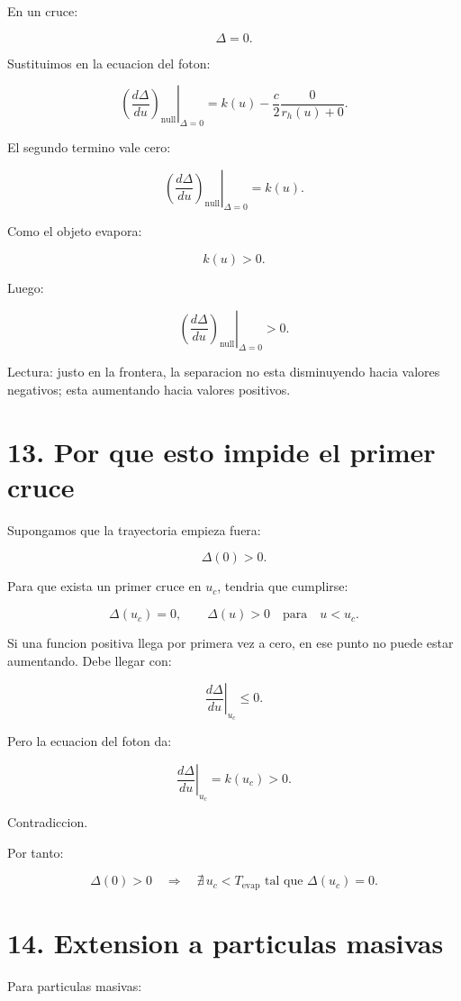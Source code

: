 ﻿\documentclass[11pt,a4paper]{article}
\begin{document}
En un cruce:

\[
\Delta=0.
\]

Sustituimos en la ecuacion del foton:

\[
\left.
\left(
\frac{d\Delta}{du}
\right)_{\mathrm{null}}
\right|_{\Delta=0}
=
k(u)
-
\frac{c}{2}
\frac{0}{r_h(u)+0}.
\]

El segundo termino vale cero:

\[
\left.
\left(
\frac{d\Delta}{du}
\right)_{\mathrm{null}}
\right|_{\Delta=0}
=
k(u).
\]

Como el objeto evapora:

\[
k(u)>0.
\]

Luego:

\[
\left.
\left(
\frac{d\Delta}{du}
\right)_{\mathrm{null}}
\right|_{\Delta=0}
>0.
\]

Lectura: justo en la frontera, la separacion no esta disminuyendo hacia valores negativos; esta aumentando hacia valores positivos.

\section{13. Por que esto impide el primer cruce}

Supongamos que la trayectoria empieza fuera:

\[
\Delta(0)>0.
\]

Para que exista un primer cruce en \(u_c\), tendria que cumplirse:

\[
\Delta(u_c)=0,
\qquad
\Delta(u)>0
\quad
\text{para}
\quad
u<u_c.
\]

Si una funcion positiva llega por primera vez a cero, en ese punto no puede estar aumentando. Debe llegar con:

\[
\left.\frac{d\Delta}{du}\right|_{u_c}\leq0.
\]

Pero la ecuacion del foton da:

\[
\left.\frac{d\Delta}{du}\right|_{u_c}
=
k(u_c)>0.
\]

Contradiccion.

Por tanto:

\[
\Delta(0)>0
\quad\Longrightarrow\quad
\nexists\,u_c<T_{\mathrm{evap}}
\text{ tal que }
\Delta(u_c)=0.
\]

\section{14. Extension a particulas masivas}

Para particulas masivas:
\end{document}

